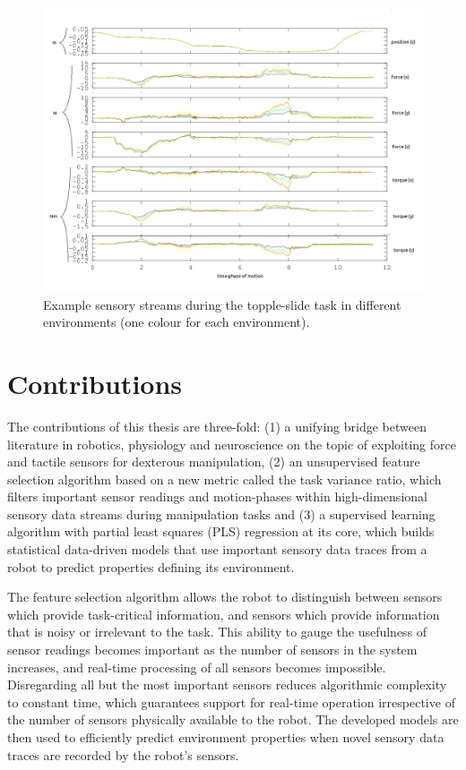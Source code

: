 \begin{figure}[hbt]
	\centering
	\includegraphics[width=\linewidth]{images/eg_sensor_trace}
	\caption{Example sensory streams during the topple-slide task in different environments (one colour for each environment).
}
	\label{fig:eg_sensor_trace}
\end{figure}





\section{Contributions}
The contributions of this thesis are three-fold: 
(1) a unifying bridge between literature in robotics, physiology and neuroscience on the topic of exploiting force and tactile sensors for dexterous manipulation, 
(2) an unsupervised feature selection algorithm based on a new metric called the task variance ratio, which filters important sensor readings and motion-phases within high-dimensional sensory data streams during manipulation tasks and 
(3) a supervised learning algorithm with partial least squares (PLS) regression at its core, which builds statistical data-driven models that use important sensory data traces from a robot to predict properties defining its environment.

The feature selection algorithm allows the robot to distinguish between sensors which provide task-critical information, and sensors which provide information that is noisy or irrelevant to the task.
This ability to gauge the usefulness of sensor readings becomes important as the number of sensors in the system increases, and real-time processing of all sensors becomes impossible.
Disregarding all but the most important sensors reduces algorithmic complexity to constant time, which guarantees support for real-time operation irrespective of the number of sensors physically available to the robot.
The developed models are then used to efficiently predict environment properties when novel sensory data traces are recorded by the robot's sensors.

